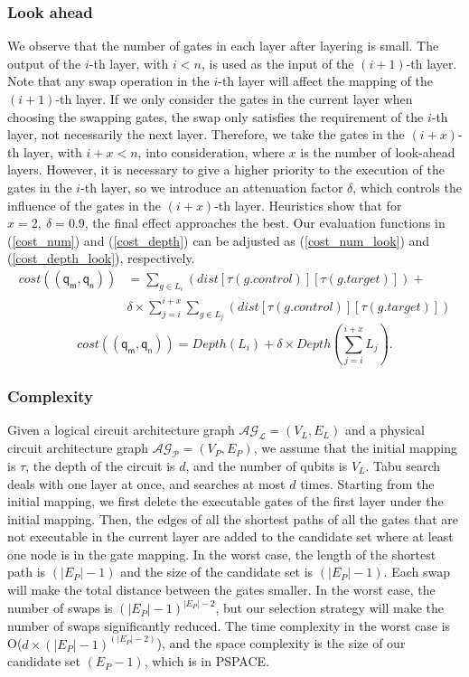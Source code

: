 \documentclass[journal]{IEEEtran}
\begin{document}
	\subsubsection{Look ahead}
	We observe that the number of gates in each layer after layering is small. The output of the $i$-th layer, with $i<n$,  is used as the input of the $(i+1)$-th layer. Note that any swap operation in the $i$-th layer will affect the mapping of the $(i+1)$-th layer. If we only consider the gates in the current layer when choosing the swapping gates, the swap only satisfies the requirement of the $i$-th layer, not necessarily the next layer. Therefore, we take the gates in the $(i+x)$-th layer, with $i+x<n$,  into consideration, where $x$ is the number of look-ahead layers. However, it is necessary to give a higher priority to the execution of the gates in the $i$-th layer, so we introduce an attenuation factor $\delta$, which controls the influence of the gates in the $(i+x)$-th layer. Heuristics show that for $x=2,\ \delta=0.9$, the final effect approaches the best. Our evaluation functions in (\ref{cost_num}) and  (\ref{cost_depth}) can be adjusted as
	(\ref{cost_num_look}) and  (\ref{cost_depth_look}), respectively.
	\begin{equation}
		\begin{aligned}
			cost((\textsf{q}_\textsf{m},\textsf{q}_\textsf{n}))&=\sum_{g \in L_{i}}(dist[\tau(g.control)][\tau(g.target)])+\\
			&\delta \times \sum_{j=i}^{i+x}\sum_{g \in L_{j}}(dist[\tau(g.control)][\tau(g.target)])
			\label{cost_num_look}
		\end{aligned}
	\end{equation}
	\begin{equation}
		cost((\textsf{q}_\textsf{m},\textsf{q}_\textsf{n}))= Depth(L_{i})+\delta \times Depth(\sum_{j=i}^{i+x}L_{j}).
		\label{cost_depth_look}
	\end{equation}
	\subsubsection{Complexity}
	Given a logical circuit architecture graph  $\mathcal{AG_{L}}=(V_{L},E_{L})$ and a physical circuit architecture graph $\mathcal{AG_{P}}=(V_{P},E_{P})$, we assume that the initial mapping is $\tau$, the depth of the circuit is $d$, and the number of qubits is $V_{L}$. Tabu search deals with one layer at once, and searches at most $d$ times. Starting from the initial mapping, we first delete the executable gates of the first layer under the initial mapping. Then, the edges of all the shortest paths of all the gates that are not executable in the current layer are added to the candidate set where at least one node is in the gate mapping. In the worst case, the length of the shortest path  is $(|E_{P}|-1)$
	and the size of the candidate set  is $(|E_{P}|-1)$. Each swap will make the total distance between the gates smaller. In the worst case, the number of swaps is $(|E_{P}|-1)^{|E_{P}|-2}$, but our selection strategy will make the number of swaps significantly reduced. The time complexity in the worst case is O($d\times (|E_{P}|-1)^{(|E_{P}|-2)}$), and the space complexity is the size of our candidate set $(E_{P}-1)$, which is in PSPACE.
\end{document}
